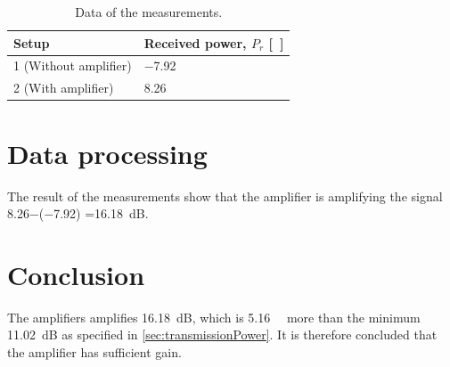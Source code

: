 \begin{table}[!h]
	\centering
	\caption{Data of the measurements.}\label{tab_appendix:TransmitterResults}
	\begin{tabularx}{\textwidth}{lX}
	 Setup & Received power, $P_r$ [\si{\deci\belm}] \\ \toprule \rowcolor{lightGrey}
		1 (Without amplifier) & \SI{-7.92}{\deci\belm} 	\\
		2 (With amplifier)	& \SI{8.26}{\deci\belm} \\ 
	\end{tabularx}
\end{table}

\section*{Data processing}
The result of the measurements show that the amplifier is amplifying the signal \SI{8.26}{}$ - $(\SI{-7.92}{}) =\SI{16.18}{\deci\bel}.

\section*{Conclusion}
The amplifiers amplifies \SI{16.18}{\deci\bel}, which is \SI{5.16}{\deci\belm} more than the minimum \SI{11.02}{\deci\bel} as specified in \autoref{sec:transmissionPower}. It is therefore concluded that the amplifier has sufficient gain.
